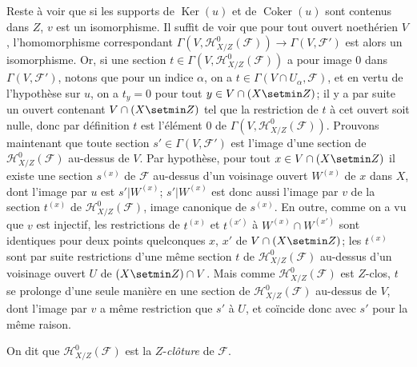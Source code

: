 Reste à voir que si les supports de $\operatorname{Ker}(u)$ et de
$\operatorname{Coker}(u)$ sont contenus dans $Z$, $v$ est un isomorphisme.
Il suffit de voir que pour tout ouvert noethérien $V$, l'homomorphisme
correspondant
$\Gamma(V,\mathcal H^0_{X/Z}(\mathcal F))
\longrightarrow\Gamma(V,\mathcal F')$
est alors un isomorphisme. Or, si une section
$t\in\Gamma(V,\mathcal H^0_{X/Z}(\mathcal F))$ a pour image $0$ dans
$\Gamma(V,\mathcal F')$, notons que pour un indice $\alpha$, on a
$t\in\Gamma(V\cap U_\alpha,\mathcal F)$, et en vertu de l'hypothèse sur
$u$, on a $t_y=0$ pour tout $y\in V\cap(X\setmin Z)$; il y a par suite un ouvert
contenant $V\cap(X\setmin Z)$ tel que la restriction de $t$ à cet ouvert soit
nulle, donc par définition $t$ est l'élément $0$ de
$\Gamma(V,\mathcal H^0_{X/Z}(\mathcal F))$.
Prouvons maintenant que toute section $s'\in\Gamma(V,\mathcal F')$ est
l'image d'une section de $\mathcal H^0_{X/Z}(\mathcal F)$ au-dessus de $V$.
Par hypothèse, pour tout $x\in V\cap(X\setmin Z)$ il existe une section $s^{(x)}$
de $\mathcal F$ au-dessus d'un voisinage ouvert $W^{(x)}$ de $x$ dans $X$,
dont l'image par $u$ est $s'|W^{(x)}$; $s'|W^{(x)}$ est donc aussi l'image
par $v$ de la section $t^{(x)}$ de $\mathcal H^0_{X/Z}(\mathcal F)$, image
canonique de $s^{(x)}$. En outre, comme on a vu que $v$ est injectif, les
restrictions de $t^{(x)}$ et $t^{(x')}$ à $W^{(x)}\cap W^{(x')}$ sont
identiques pour deux points quelconques $x$, $x'$ de $V\cap(X\setmin Z)$; les
$t^{(x)}$ sont par suite restrictions d'une même section $t$ de
$\mathcal H^0_{X/Z}(\mathcal F)$ au-dessus d'un voisinage ouvert $U$ de
$(X\setmin Z)\cap V$. Mais comme $\mathcal H^0_{X/Z}(\mathcal F)$ est $Z$-clos,
$t$ se prolonge d'une seule manière en une section de
$\mathcal H^0_{X/Z}(\mathcal F)$ au-dessus de $V$, dont l'image par $v$ a
même restriction que $s'$ à $U$, et coïncide donc avec $s'$ pour la même
raison.

On dit que $\mathcal H^0_{X/Z}(\mathcal F)$ est la $Z$-\emph{clôture} de
$\mathcal F$.



